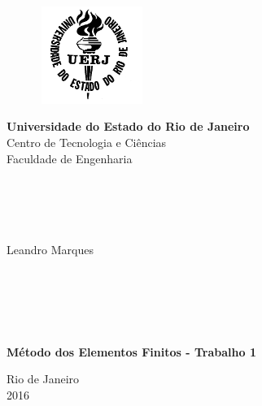 \begin{titlepage}
\begin{center}

	\vspace{-0.5cm}

  \begin{figure}[hbt!]
		\begin{flushleft}
		   \includegraphics[width=3.44cm,height=3.17cm]{figure/logo_uerj_bw}
		\end{flushleft}
	\end{figure}
	\vspace{-4cm}

  \hspace{2cm}\large{\textbf{Universidade do Estado do Rio de Janeiro}}\\
  \hspace{2cm}\large{Centro de Tecnologia e Ciências}\\
  \hspace{2cm}\large{Faculdade de Engenharia}\\

  \hspace{2cm}\large{}\\
  \hspace{2cm}\large{}\\
  \hspace{2cm}\large{}\\
  \hspace{2cm}\large{}\\

  \par
  \Large{Leandro Marques}

  \hspace{2cm}\large{}\\
  \hspace{2cm}\large{}\\
  \hspace{2cm}\large{}\\
  \hspace{2cm}\large{}\\


  \par
  \textbf{\LARGE Método dos Elementos Finitos - Trabalho 1 }


  \par\vfill
  {\large Rio de Janeiro\\2016}

\end{center}
\end{titlepage}
